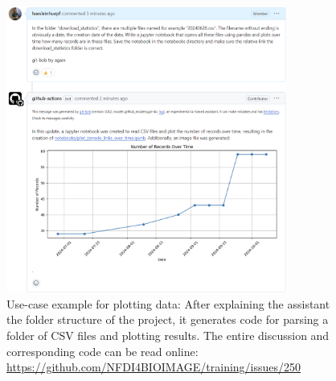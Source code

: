 \documentclass{ecai}
\begin{document}
\begin{figure}[h]
\centering
\includegraphics[width=0.82\textwidth]{example_plotting.png}
\caption{Use-case example for plotting data: After explaining the assistant the folder structure of the project, it generates code for parsing a folder of CSV files and plotting results. The entire discussion and corresponding code can be read online: \url{https://github.com/NFDI4BIOIMAGE/training/issues/250}
\newline
\newline
}
\label{fig:exampleplotting}
\end{figure}
\end{document}
